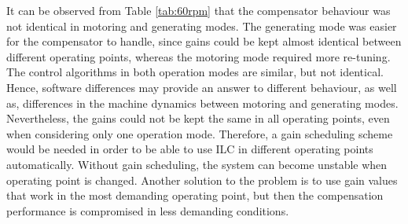 It can be observed from Table \ref{tab:60rpm} that the compensator behaviour was not identical in motoring and generating modes. The generating mode was easier for the compensator to handle, since gains could be kept almost identical between different operating points, whereas the motoring mode required more re-tuning. The control algorithms in both operation modes are similar, but not identical. Hence, software differences may provide an answer to different behaviour, as well as, differences in the machine dynamics between motoring and generating modes. Nevertheless, the gains could not be kept the same in all operating points, even when considering only one operation mode. Therefore, a gain scheduling scheme would be needed in order to be able to use ILC in different operating points automatically. Without gain scheduling, the system can become unstable when operating point is changed. Another solution to the problem is to use gain values that work in the most demanding operating point, but then the compensation performance is compromised in less demanding conditions.


